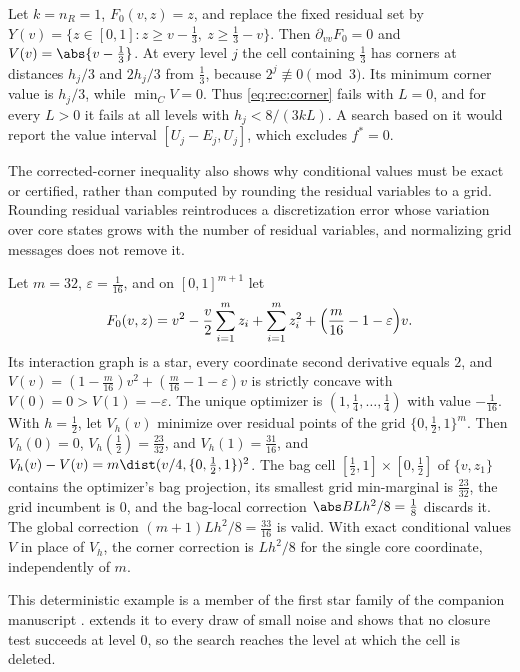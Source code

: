\begin{example}\label{ex:rec:feasibility}
Let $k=n_R=1$, $F_0(v,z)=z$, and replace the fixed residual set by
$Y(v)=\{z\in[0,1]:z\ge v-\frac13,\ z\ge\frac13-v\}$. Then $\partial_{vv}F_0=0$
and $V(v)=\abs{v-\frac13}$. At every level $j$ the cell containing $\frac13$
has corners at distances $h_j/3$ and $2h_j/3$ from $\frac13$, because
$2^j\not\equiv0\pmod3$. Its minimum corner value is $h_j/3$, while
$\min_CV=0$. Thus \eqref{eq:rec:corner} fails with $L=0$, and for every
$L>0$ it fails at all levels with $h_j<8/(3kL)$. A search based on it would
report the value interval $[U_j-E_j,U_j]$, which excludes $f^*=0$.
\end{example}

The corrected-corner inequality also shows why conditional values must be
exact or certified, rather than computed by rounding the residual variables
to a grid. Rounding residual variables reintroduces a discretization error
whose variation over core states grows with the number of residual
variables, and normalizing grid messages does not remove it.

\begin{example}\label{ex:rec:star}
Let $m=32$, $\varepsilon=\frac1{16}$, and on $[0,1]^{m+1}$ let
\[
 F_0(v,z)=v^2-\frac v2\sum_{i=1}^mz_i+\sum_{i=1}^mz_i^2
 +\Bigl(\frac m{16}-1-\varepsilon\Bigr)v .
\]
Its interaction graph is a star, every coordinate second derivative equals
$2$, and $V(v)=(1-\frac m{16})v^2+(\frac m{16}-1-\varepsilon)v$ is strictly
concave with $V(0)=0>V(1)=-\varepsilon$. The unique optimizer is
$(1,\frac14,\ldots,\frac14)$ with value $-\frac1{16}$. With $h=\frac12$, let
$V_h(v)$ minimize over residual points of the grid $\{0,\frac12,1\}^m$. Then
$V_h(0)=0$, $V_h(\frac12)=\frac{23}{32}$, and $V_h(1)=\frac{31}{16}$, and
$V_h(v)-V(v)=m\dist(v/4,\{0,\frac12,1\})^2$. The bag cell
$[\frac12,1]\times[0,\frac12]$ of $\{v,z_1\}$ contains the optimizer's bag
projection, its smallest grid min-marginal is $\frac{23}{32}$, the grid
incumbent is $0$, and the bag-local correction $\abs BLh^2/8=\frac18$
discards it. The global correction $(m+1)Lh^2/8=\frac{33}{16}$ is valid. With
exact conditional values $V$ in place of $V_h$, the corner correction is
$Lh^2/8$ for the single core coordinate, independently of $m$.
\end{example}

This deterministic example is a member of the first star family of the
companion manuscript \citep{companion-decomposition-aware}.
 extends it to every draw of small noise and shows
that no closure test succeeds at level $0$, so the search reaches the level
at which the cell is deleted.

